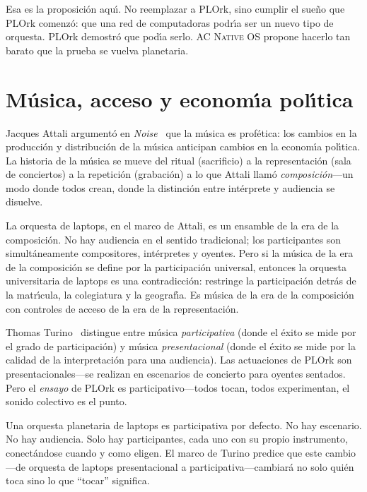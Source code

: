 \documentclass[10pt,letterpaper,twocolumn]{article}
\newcommand{\acos}{\textsc{AC Native OS}}
\begin{document}
Esa es la proposici\'{o}n aqu\'{\i}. No reemplazar a PLOrk, sino cumplir el sue\~{n}o que PLOrk comenz\'{o}: que una red de computadoras podr\'{\i}a ser un nuevo tipo de orquesta. PLOrk demostr\'{o} que pod\'{\i}a serlo. \acos{} propone hacerlo tan barato que la prueba se vuelva planetaria.


\section{M\'{u}sica, acceso y econom\'{\i}a pol\'{\i}tica}
\label{sec:theory}

Jacques Attali argument\'{o} en \emph{Noise}~\citep{attali1985noise} que la m\'{u}sica es prof\'{e}tica: los cambios en la producci\'{o}n y distribuci\'{o}n de la m\'{u}sica anticipan cambios en la econom\'{\i}a pol\'{\i}tica. La historia de la m\'{u}sica se mueve del ritual (sacrificio) a la representaci\'{o}n (sala de conciertos) a la repetici\'{o}n (grabaci\'{o}n) a lo que Attali llam\'{o} \emph{composici\'{o}n}---un modo donde todos crean, donde la distinci\'{o}n entre int\'{e}rprete y audiencia se disuelve.

La orquesta de laptops, en el marco de Attali, es un ensamble de la era de la composici\'{o}n. No hay audiencia en el sentido tradicional; los participantes son simult\'{a}neamente compositores, int\'{e}rpretes y oyentes. Pero si la m\'{u}sica de la era de la composici\'{o}n se define por la participaci\'{o}n universal, entonces la orquesta universitaria de laptops es una contradicci\'{o}n: restringe la participaci\'{o}n detr\'{a}s de la matr\'{\i}cula, la colegiatura y la geograf\'{\i}a. Es m\'{u}sica de la era de la composici\'{o}n con controles de acceso de la era de la representaci\'{o}n.

Thomas Turino~\citep{turino2008music} distingue entre m\'{u}sica \emph{participativa} (donde el \'{e}xito se mide por el grado de participaci\'{o}n) y m\'{u}sica \emph{presentacional} (donde el \'{e}xito se mide por la calidad de la interpretaci\'{o}n para una audiencia). Las actuaciones de PLOrk son presentacionales---se realizan en escenarios de concierto para oyentes sentados. Pero el \emph{ensayo} de PLOrk es participativo---todos tocan, todos experimentan, el sonido colectivo es el punto.

Una orquesta planetaria de laptops es participativa por defecto. No hay escenario. No hay audiencia. Solo hay participantes, cada uno con su propio instrumento, conect\'{a}ndose cuando y como eligen. El marco de Turino predice que este cambio---de orquesta de laptops presentacional a participativa---cambiar\'{a} no solo qui\'{e}n toca sino lo que ``tocar'' significa.
\end{document}
